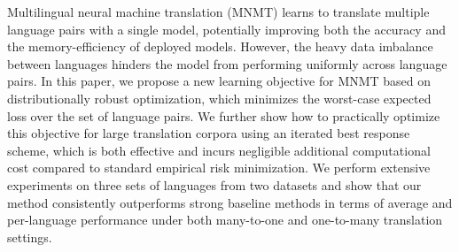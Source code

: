 Multilingual neural machine translation (MNMT) learns to translate multiple language pairs with a single model, potentially improving both the accuracy and the memory-efficiency of deployed models. However, the heavy data imbalance between languages hinders the model from performing uniformly across language pairs. In this paper, we propose a new learning objective for MNMT based on distributionally robust optimization, which minimizes the worst-case expected loss over the set of language pairs. We further show how to practically optimize this objective for large translation corpora using an iterated best response scheme, which is both effective and incurs negligible additional computational cost compared to standard empirical risk minimization. We perform extensive experiments on three sets of languages from two datasets and show that our method consistently outperforms strong baseline methods in terms of average and per-language performance under both many-to-one and one-to-many translation settings.
